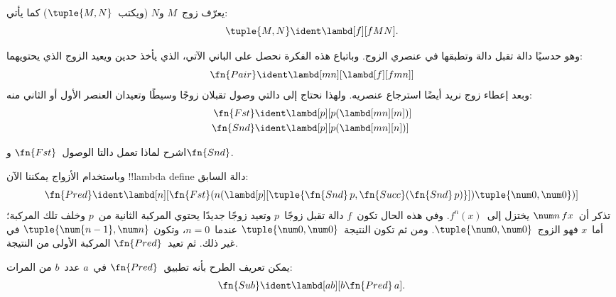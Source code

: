 \documentclass[../../../include/open-logic-section]{subfiles}
\begin{document}

\begin{defn}
يعرّف زوج~$M$ و$N$ (ويكتب~$\tuple{M,N}$) كما يأتي:
\[
\tuple{M,N} \ident \lambd[f][fMN].
\]
\end{defn}
  
وهو حدسيًا دالة تقبل دالة وتطبقها في عنصري الزوج. وباتباع هذه الفكرة
نحصل على الباني الآتي، الذي يأخذ حدين ويعيد الزوج الذي يحتويهما:
\[
  \fn{Pair} \ident \lambd[mn][\lambd[f][fmn]]
\]
وبعد إعطاء زوج نريد أيضًا استرجاع عنصريه. ولهذا نحتاج إلى دالتي وصول
تقبلان زوجًا وسيطًا وتعيدان العنصر الأول أو الثاني منه:
\begin{align*}
  \fn{Fst} & \ident \lambd[p][p(\lambd[mn][m])]\\
  \fn{Snd} & \ident \lambd[p][p(\lambd[mn][n])]
\end{align*}

\begin{prob}
  اشرح لماذا تعمل دالتا الوصول~$\fn{Fst}$ و$\fn{Snd}$.
\end{prob}

وباستخدام الأزواج يمكننا الآن !!{lambda define} دالة السابق:
\[
  \fn{Pred} \ident \lambd[n][\fn{Fst}(n (\lambd[p][\tuple{\fn{Snd}\, {p}, \fn{Succ}(\fn{Snd}\, {p})}]) \tuple{\num 0, \num 0})]
\]
تذكر أن~$\num n\, f x$ يختزل إلى~$f^{n}(x)$. وفي هذه الحال تكون~$f$
دالة تقبل زوجًا~$p$ وتعيد زوجًا جديدًا يحتوي المركبة الثانية من~$p$
وخلف تلك المركبة؛ أما~$x$ فهو الزوج~$\tuple{\num 0,\num 0}$. ومن ثم
تكون النتيجة~$\tuple{\num 0,\num 0}$ عندما~$n=0$، وتكون
$\tuple{\num{n-1}, \num n}$ في غير ذلك. ثم تعيد~$\fn{Pred}$ المركبة
الأولى من النتيجة.

يمكن تعريف الطرح بأنه تطبيق~$\fn{Pred}$ في~$a$ عدد~$b$ من المرات:
\[
\fn{Sub} \ident \lambd[ab][b \fn{Pred}\, a].
\]
    
\end{document}
